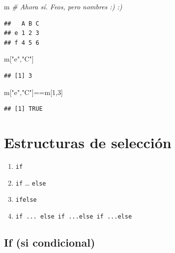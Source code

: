 \documentclass[
]{book}
\newenvironment{Shaded}{\begin{snugshade}}{\end{snugshade}}
\newcommand{\CommentTok}[1]{\textcolor[rgb]{0.56,0.35,0.01}{\textit{#1}}}
\newcommand{\DecValTok}[1]{\textcolor[rgb]{0.00,0.00,0.81}{#1}}
\newcommand{\NormalTok}[1]{#1}
\newcommand{\SpecialCharTok}[1]{\textcolor[rgb]{0.00,0.00,0.00}{#1}}
\newcommand{\StringTok}[1]{\textcolor[rgb]{0.31,0.60,0.02}{#1}}
\providecommand{\tightlist}{%
  \setlength{\itemsep}{0pt}\setlength{\parskip}{0pt}}
\begin{document}
\begin{Shaded}
\begin{Highlighting}[]
\NormalTok{m   }\CommentTok{\# Ahora sí. Feos, pero nombres :) :)}
\end{Highlighting}
\end{Shaded}

\begin{verbatim}
##   A B C
## e 1 2 3
## f 4 5 6
\end{verbatim}

\begin{Shaded}
\begin{Highlighting}[]
\NormalTok{m[}\StringTok{"e"}\NormalTok{,}\StringTok{"C"}\NormalTok{]}
\end{Highlighting}
\end{Shaded}

\begin{verbatim}
## [1] 3
\end{verbatim}

\begin{Shaded}
\begin{Highlighting}[]
\NormalTok{m[}\StringTok{"e"}\NormalTok{,}\StringTok{"C"}\NormalTok{]}\SpecialCharTok{==}\NormalTok{m[}\DecValTok{1}\NormalTok{,}\DecValTok{3}\NormalTok{]}
\end{Highlighting}
\end{Shaded}

\begin{verbatim}
## [1] TRUE
\end{verbatim}

\hypertarget{Estructuras_de_seleccion}{%
\chapter{Estructuras de selección}\label{Estructuras_de_seleccion}}

\begin{enumerate}
\def\labelenumi{\arabic{enumi}.}
\tightlist
\item
  \texttt{if}
\item
  \texttt{if} \ldots{} \texttt{else}
\item
  \texttt{ifelse}
\item
  \texttt{if\ ...\ else\ if\ ...else\ if\ ...else}
\end{enumerate}

\hypertarget{if-si-condicional}{%
\section{If (si condicional)}\label{if-si-condicional}}
\end{document}
